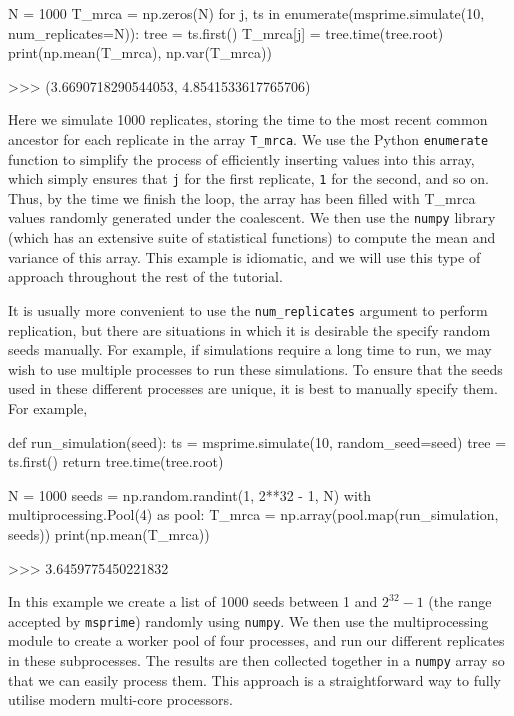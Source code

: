 \documentclass[graybox]{svmult}
\newcommand{\msprime}[0]{\texttt{msprime}}
\begin{document}
\begin{pythoncode}
N = 1000
T_mrca = np.zeros(N)
for j, ts in enumerate(msprime.simulate(10, num_replicates=N)):
    tree = ts.first()
    T_mrca[j] = tree.time(tree.root)
print(np.mean(T_mrca), np.var(T_mrca))

>>> (3.6690718290544053, 4.8541533617765706)
\end{pythoncode}

    Here we simulate 1000 replicates, storing the time to the most recent
common ancestor for each replicate in the array \texttt{T\_mrca}.  We use the Python \texttt{enumerate} function to simplify the process of efficiently inserting values into this
array, which simply ensures that \texttt{j} for the first replicate,
\texttt{1} for the second, and so on. Thus, by the time we finish the
loop, the array has been filled with T\_mrca values randomly generated
under the coalescent. We then use the \texttt{numpy} library (which has
an extensive suite of statistical functions) to compute the mean and
variance of this array. This example is idiomatic, and we will use this
type of approach throughout the rest of the tutorial.

It is usually more convenient to use the \texttt{num\_replicates}
argument to perform replication, but there are situations in which it is
desirable the specify random seeds manually. For example, if simulations
require a long time to run, we may wish to use multiple processes to
run these simulations. To ensure that the seeds used in these different
processes are unique, it is best to manually specify them. For example,

\begin{pythoncode}
def run_simulation(seed):
    ts = msprime.simulate(10, random_seed=seed)
    tree = ts.first()
    return tree.time(tree.root)

N = 1000
seeds = np.random.randint(1, 2**32 - 1, N)
with multiprocessing.Pool(4) as pool:
    T_mrca = np.array(pool.map(run_simulation, seeds))
print(np.mean(T_mrca))

>>> 3.6459775450221832
\end{pythoncode}

    In this example we create a list of 1000 seeds between 1 and $2^{32} -
1$ (the range accepted by \msprime) randomly using \texttt{numpy}. We then use the
multiprocessing module to create a worker pool of four processes, and
run our different replicates in these subprocesses. The results are then
collected together in a \texttt{numpy} array so that we can easily process them.
This approach is a straightforward way to fully utilise modern
multi-core processors.
\end{document}
